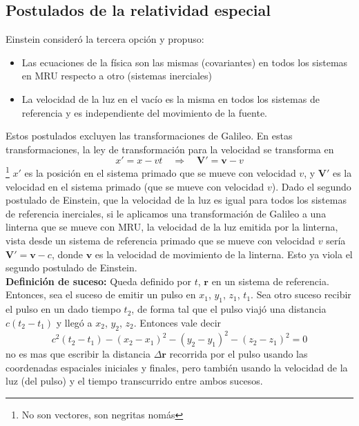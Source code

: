 \subsection{Postulados de la relatividad especial}
Einstein consideró la tercera opción y propuso:
\begin{itemize}
    \item Las ecuaciones de la física son las mismas (covariantes) en todos los sistemas en MRU respecto a otro (sistemas inerciales)
    \item La velocidad de la luz en el vacío es la misma en todos los sistemas de referencia y es independiente del movimiento de la fuente.
\end{itemize}
Estos postulados excluyen las transformaciones de Galileo. En estas transformaciones, la ley de transformación para la velocidad se transforma en
\begin{equation*}
    x' = x - vt
    \quad\Longrightarrow\quad
    \mathbf{V}' = \textbf{v} - v
\end{equation*}\footnote{No son vectores, son negritas nomás}
$x'$ es la posición en el sistema primado que se mueve con velocidad $v$, y $\mathbf{V}'$ es la velocidad en el sistema primado (que se mueve con velocidad $v$). Dado el segundo postulado de Einstein, que la velocidad de la luz es igual para todos los sistemas de referencia inerciales, si le aplicamos una transformación de Galileo a una linterna que se mueve con MRU, la velocidad de la luz emitida por la linterna, vista desde un sistema de referencia primado que se mueve con velocidad $v$ sería $\mathbf{V}' = \mathbf{v} - c$, donde $\mathbf{v}$ es la velocidad de movimiento de la linterna. Esto ya viola el segundo postulado de Einstein.\\
\indent \textbf{Definición de suceso:} Queda definido por $t$, $\textbf{r}$ en un sistema de referencia.\\
\indent Entonces, sea el suceso de emitir un pulso en $x_{1}$, $y_{1}$, $z_{1}$, $t_{1}$. Sea otro suceso recibir el pulso en un dado tiempo $t_{2}$, de forma tal que el pulso viajó una distancia $c(t_{2}-t_{1})$ y llegó a $x_{2}$, $y_{2}$, $z_{2}$. Entonces vale decir
\begin{equation*}
    c^{2}(t_{2}-t_{1}) - (x_{2}-x_{1})^{2} -(y_{2}-y_{1})^{2}-(z_{2}-z_{1})^{2} = 0
\end{equation*}
no es mas que escribir la distancia $\Delta \textbf{r}$ recorrida por el pulso usando las coordenadas espaciales iniciales y finales, pero también usando la velocidad de la luz (del pulso) y el tiempo transcurrido entre ambos sucesos.\\
